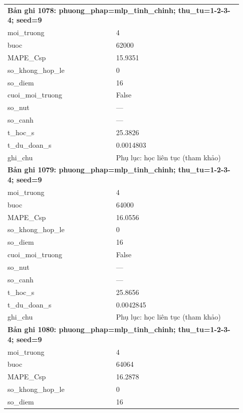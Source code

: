 \begin{longtable}{p{0.43\linewidth}p{0.50\linewidth}}
\midrule
\multicolumn{2}{p{0.95\linewidth}}{\textbf{Bản ghi 1078: phuong\_phap=mlp\_tinh\_chinh; thu\_tu=1-2-3-4; seed=9}} \\
moi\_\allowbreak truong & 4 \\
buoc & 62000 \\
MAPE\_\allowbreak Csp & 15.9351 \\
so\_\allowbreak khong\_\allowbreak hop\_\allowbreak le & 0 \\
so\_\allowbreak diem & 16 \\
cuoi\_\allowbreak moi\_\allowbreak truong & False \\
so\_\allowbreak nut & — \\
so\_\allowbreak canh & — \\
t\_\allowbreak hoc\_\allowbreak s & 25.3826 \\
t\_\allowbreak du\_\allowbreak doan\_\allowbreak s & 0.0014803 \\
ghi\_\allowbreak chu & Phụ lục: học liên tục (tham khảo) \\
\midrule
\multicolumn{2}{p{0.95\linewidth}}{\textbf{Bản ghi 1079: phuong\_phap=mlp\_tinh\_chinh; thu\_tu=1-2-3-4; seed=9}} \\
moi\_\allowbreak truong & 4 \\
buoc & 64000 \\
MAPE\_\allowbreak Csp & 16.0556 \\
so\_\allowbreak khong\_\allowbreak hop\_\allowbreak le & 0 \\
so\_\allowbreak diem & 16 \\
cuoi\_\allowbreak moi\_\allowbreak truong & False \\
so\_\allowbreak nut & — \\
so\_\allowbreak canh & — \\
t\_\allowbreak hoc\_\allowbreak s & 25.8656 \\
t\_\allowbreak du\_\allowbreak doan\_\allowbreak s & 0.0042845 \\
ghi\_\allowbreak chu & Phụ lục: học liên tục (tham khảo) \\
\midrule
\multicolumn{2}{p{0.95\linewidth}}{\textbf{Bản ghi 1080: phuong\_phap=mlp\_tinh\_chinh; thu\_tu=1-2-3-4; seed=9}} \\
moi\_\allowbreak truong & 4 \\
buoc & 64064 \\
MAPE\_\allowbreak Csp & 16.2878 \\
so\_\allowbreak khong\_\allowbreak hop\_\allowbreak le & 0 \\
so\_\allowbreak diem & 16 \\

\end{longtable}
